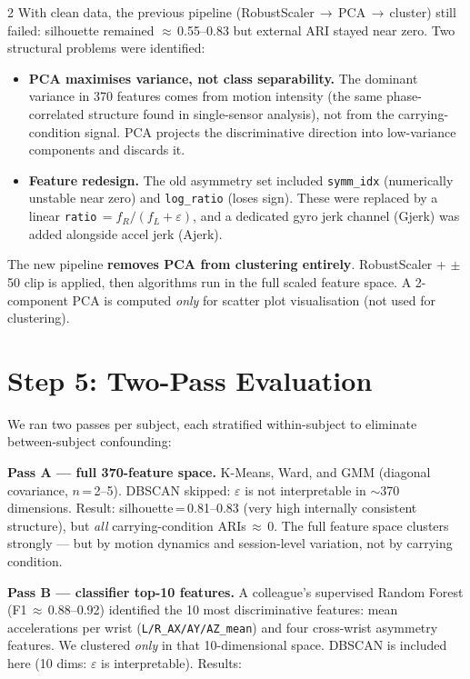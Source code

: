 \documentclass[10pt,a4paper]{article}
\begin{document}
\begin{multicols}{2}
With clean data, the previous pipeline (RobustScaler\,$\to$\,PCA\,$\to$\,cluster)
still failed: silhouette remained $\approx$\,0.55--0.83 but external ARI stayed near
zero.
Two structural problems were identified:

\begin{itemize}
  \item \textbf{PCA maximises variance, not class separability.}  The dominant
        variance in 370 features comes from motion intensity (the same
        phase-correlated structure found in single-sensor analysis), not from
        the carrying-condition signal.  PCA projects the discriminative direction
        into low-variance components and discards it.
  \item \textbf{Feature redesign.}  The old asymmetry set included
        \texttt{symm\_idx} (numerically unstable near zero) and
        \texttt{log\_ratio} (loses sign).  These were replaced by a linear
        \texttt{ratio}\,$= f_R / (f_L + \varepsilon)$, and a dedicated gyro jerk
        channel (Gjerk) was added alongside accel jerk (Ajerk).
\end{itemize}

The new pipeline \textbf{removes PCA from clustering entirely}.
RobustScaler + $\pm$50 clip is applied, then algorithms run in the full
scaled feature space.
A 2-component PCA is computed \textit{only} for scatter plot visualisation
(not used for clustering).

\section{Step 5: Two-Pass Evaluation}

We ran two passes per subject, each stratified within-subject to eliminate
between-subject confounding:

\textbf{Pass A --- full 370-feature space.}
K-Means, Ward, and GMM (diagonal covariance, $n$\,=\,2--5).
DBSCAN skipped: $\varepsilon$ is not interpretable in $\sim$370 dimensions.
Result: silhouette\,=\,0.81--0.83 (very high internally consistent structure),
but \textit{all} carrying-condition ARIs\,$\approx$\,0.
The full feature space clusters strongly --- but by motion dynamics and
session-level variation, not by carrying condition.

\textbf{Pass B --- classifier top-10 features.}
A colleague's supervised Random Forest (F1\,$\approx$\,0.88--0.92) identified the
10 most discriminative features: mean accelerations per wrist
(\texttt{L/R\_AX/AY/AZ\_mean}) and four cross-wrist asymmetry features.
We clustered \textit{only} in that 10-dimensional space.
DBSCAN is included here (10 dims: $\varepsilon$ is interpretable).
Results:


\end{multicols}
\end{document}
